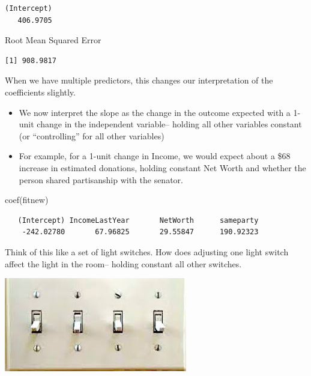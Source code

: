 \documentclass[
  letterpaper,
  DIV=11,
  numbers=noendperiod]{scrreprt}
\newenvironment{Shaded}{\begin{snugshade}}{\end{snugshade}}
\newcommand{\DecValTok}[1]{\textcolor[rgb]{0.68,0.00,0.00}{#1}}
\newcommand{\FunctionTok}[1]{\textcolor[rgb]{0.28,0.35,0.67}{#1}}
\newcommand{\NormalTok}[1]{\textcolor[rgb]{0.00,0.23,0.31}{#1}}
\newcommand{\SpecialCharTok}[1]{\textcolor[rgb]{0.37,0.37,0.37}{#1}}
\providecommand{\tightlist}{%
  \setlength{\itemsep}{0pt}\setlength{\parskip}{0pt}}\usepackage{longtable,booktabs,array}
\begin{document}
\begin{verbatim}
(Intercept) 
   406.9705 
\end{verbatim}

Root Mean Squared Error

\begin{Shaded}
\end{Shaded}

\begin{verbatim}
[1] 908.9817
\end{verbatim}

When we have multiple predictors, this changes our interpretation of the
coefficients slightly.

\begin{itemize}
\tightlist
\item
  We now interpret the slope as the change in the outcome expected with
  a 1-unit change in the independent variable-- holding all other
  variables constant (or ``controlling'' for all other variables)
\item
  For example, for a 1-unit change in Income, we would expect about a
  \$68 increase in estimated donations, holding constant Net Worth and
  whether the person shared partisanship with the senator.
\end{itemize}

\begin{Shaded}
\begin{Highlighting}[]
\FunctionTok{coef}\NormalTok{(fitnew)}
\end{Highlighting}
\end{Shaded}

\begin{verbatim}
   (Intercept) IncomeLastYear       NetWorth      sameparty 
    -242.02780       67.96825       29.55847      190.92323 
\end{verbatim}

Think of this like a set of light switches. How does adjusting one light
switch affect the light in the room-- holding constant all other
switches.

\includegraphics[width=0.6\textwidth,height=\textheight]{images/lightswitch.jpeg}
\end{document}
